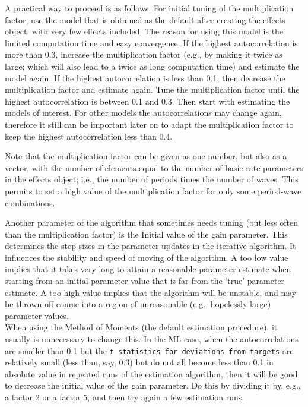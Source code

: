 \documentclass[a4paper,fleqn,11pt]{article}
\newcommand{\+}{\, + \,}
\begin{document}
A practical way to proceed is as follows.
For initial tuning of the multiplication factor, use the model that
is obtained as the default after creating the effects object,
with very few effects included. The reason for using this model
is the limited computation time and easy convergence.
If the highest autocorrelation is more than 0.3, increase the
multiplication factor (e.g., by making it twice as large;
which will also lead to a twice as long computation time)
and estimate the model again.
If the highest autocorrelation is less than 0.1, then decrease
the multiplication factor and estimate again.
Tune the multiplication factor until the highest autocorrelation
is between 0.1 and 0.3.
Then start with estimating the models of interest.
For other models the autocorrelations may change again, therefore
it still can be important later on to adapt the multiplication factor
to keep the highest autocorrelation less than 0.4.

Note that the multiplication factor can be given as one number,
but also as a vector, with the number of elements equal to the number of
basic rate parameters in the effects object; i.e., the number
of periods times the number of waves. This permits to set a high
value of the multiplication factor for only some period-wave combinations.

Another parameter of the algorithm that sometimes needs tuning
(but less often than the multiplication factor)
is the \textsf{Initial value of the gain parameter}.
This determines the step sizes in the parameter updates in the iterative
algorithm.
It influences the stability and speed of moving of the algorithm.
A too low value implies that it takes very long to attain a
reasonable parameter estimate when starting from an initial
parameter value that is far from the `true' parameter estimate.
A too high value implies that the algorithm will be unstable,
and may be thrown off course into a region of unreasonable
(e.g., hopelessly large) parameter values.\\
When using the Method of Moments
(the default estimation procedure), it usually is unnecessary to change
this. In the ML case, when the autocorrelations are smaller
than 0.1 but the \texttt{t statistics for deviations from targets}
are relatively small (less than, say, 0.3) but do not all become
less than 0.1 in absolute value in repeated runs of the
estimation algorithm, then it will be good to decrease the
\textsf{initial value of the gain parameter}. Do this by dividing
it by, e.g., a factor 2 or a factor 5, and then try again
a few estimation runs.
\end{document}
